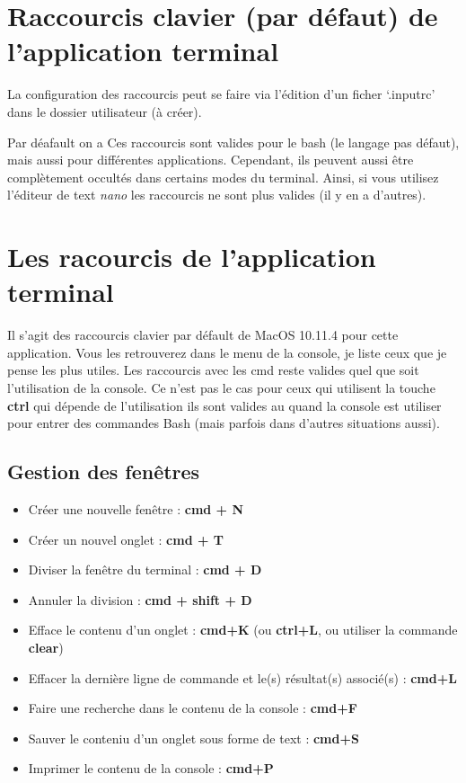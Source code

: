 \section{Raccourcis clavier (par défaut) de l'application
terminal}\label{raccourcis-clavier-par-duxe9faut-de-lapplication-terminal}

La configuration des raccourcis peut se faire via l'édition d'un ficher
`.inputrc' dans le dossier utilisateur (à créer).

Par déafault on a Ces raccourcis sont valides pour le bash (le langage
pas défaut), mais aussi pour différentes applications. Cependant, ils
peuvent aussi être complètement occultés dans certains modes du
terminal. Ainsi, si vous utilisez l'éditeur de text \emph{nano} les
raccourcis ne sont plus valides (il y en a d'autres).

\section{Les racourcis de l'application
terminal}\label{les-racourcis-de-lapplication-terminal}

Il s'agit des raccourcis clavier par défault de MacOS 10.11.4 pour cette
application. Vous les retrouverez dans le menu de la console, je liste
ceux que je pense les plus utiles. Les raccourcis avec les cmd reste
valides quel que soit l'utilisation de la console. Ce n'est pas le cas
pour ceux qui utilisent la touche \textbf{ctrl} qui dépende de
l'utilisation ils sont valides au quand la console est utiliser pour
entrer des commandes Bash (mais parfois dans d'autres situations aussi).

\subsection{Gestion des fenêtres}\label{gestion-des-fenuxeatres}

\begin{itemize}
\tightlist
\item
  Créer une nouvelle fenêtre : \textbf{cmd + N}\\
\item
  Créer un nouvel onglet : \textbf{cmd + T}
\item
  Diviser la fenêtre du terminal : \textbf{cmd + D}
\item
  Annuler la division : \textbf{cmd + shift + D}
\item
  Efface le contenu d'un onglet : \textbf{cmd+K} (ou \textbf{ctrl+L}, ou
  utiliser la commande \textbf{clear})
\item
  Effacer la dernière ligne de commande et le(s) résultat(s) associé(s)
  : \textbf{cmd+L}
\item
  Faire une recherche dans le contenu de la console : \textbf{cmd+F}
\item
  Sauver le conteniu d'un onglet sous forme de text : \textbf{cmd+S}
\item
  Imprimer le contenu de la console : \textbf{cmd+P}
\end{itemize}

